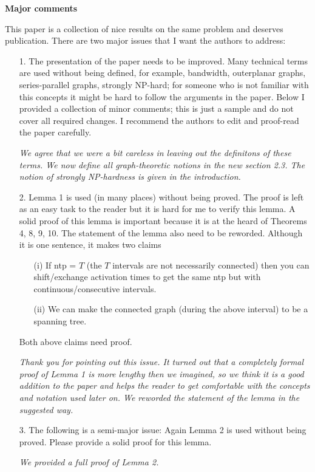 \documentclass[11pt,a4paper]{article}
\begin{document}
\textbf{Major comments}

This paper is a collection of nice results on the same problem and deserves publication. There are two major issues that I want the authors to address:

\begin{itemize}

\item[1.] The presentation of the paper needs to be improved. Many technical terms are used without being defined, for example, bandwidth, outerplanar graphs, series-parallel graphs, strongly NP-hard; for someone who is not familiar with this concepts it might be hard to follow the arguments in the paper. Below I provided a collection of minor comments; this is just a sample and do not cover all required changes. I recommend the authors to edit and proof-read the paper carefully.

\textit{We agree that we were a bit careless in leaving out the definitons of these terms. We now define all graph-theoretic notions in the new section 2.3. The notion of strongly NP-hardness is given in the introduction.}

\item[2.] Lemma 1 is used (in many places) without being proved. The proof is left as an easy task to the reader but it is hard for me to verify this lemma. A solid proof of this lemma is important because it is at the heard of Theorems 4, 8, 9, 10.
The statement of the lemma also need to be reworded. Although it is one sentence, it makes two claims
\begin{itemize}

\item[(i)] If ntp = $T$ (the $T$ intervals are not necessarily connected) then you can shift/exchange activation times to get the same ntp but with continuous/consecutive intervals.

\item[(ii)] We can make the connected graph (during the above interval) to be a spanning tree.

\end{itemize}
Both above claims need proof.


\textit{Thank you for pointing out this issue. It turned out that a completely formal proof of Lemma 1 is more lengthy then we imagined, so we think it is a good addition to the paper and helps the reader to get comfortable with the concepts and notation used later on. We reworded the statement of the lemma in the suggested way.}

\item[3.] The following is a semi-major issue: Again Lemma 2 is used without being proved. Please provide a solid proof for this lemma.

\textit{We provided a full proof of Lemma 2.}

\end{itemize}
\end{document}

